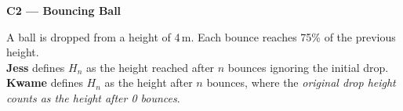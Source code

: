 \documentclass[12pt,a4paper]{article}
\begin{document}



\noindent\textbf{C2 --- Bouncing Ball}

\begin{tcolorbox}[colback=white, colframe=lightgrey, sharp corners, left=8pt, top=6pt, bottom=6pt]
A ball is dropped from a height of 4\,m. Each bounce reaches 75\% of the previous height.\\[4pt]
\textbf{Jess} defines $H_n$ as the height reached after $n$ bounces ignoring the initial drop.\\
\textbf{Kwame} defines $H_n$ as the height after $n$ bounces, where the \emph{original drop height counts as the height after 0 bounces}.
\end{tcolorbox}
\end{document}
